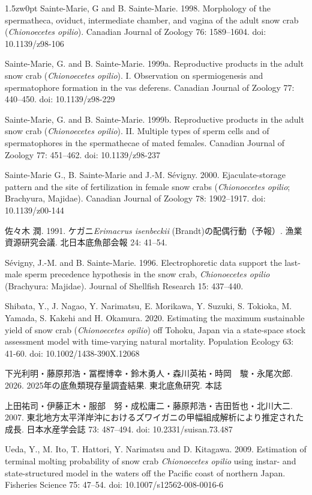\begin{indentation}{1.5zw}{0pt}
Sainte-Marie, G  and B. Sainte-Marie. 1998. Morphology of the spermatheca, oviduct, intermediate chamber, and vagina of the adult snow crab (\textit{Chionoecetes opilio}). Canadian Journal of Zoology 76: 1589--1604. doi: 10.1139/z98-106

Sainte-Marie, G. and B. Sainte-Marie. 1999a. Reproductive products in the adult snow crab (\textit{Chionoecetes opilio}). I. Observation on spermiogenesis and spermatophore formation in the vas deferens. Canadian Journal of Zoology 77: 440--450. doi: 10.1139/z98-229

Sainte-Marie, G. and B. Sainte-Marie. 1999b. Reproductive products in the adult snow crab (\textit{Chionoecetes opilio}). II. Multiple types of sperm cells and of spermatophores in the spermathecae of mated females. Canadian Journal of Zoology 77: 451--462. doi: 10.1139/z98-237

Sainte-Marie G., B. Sainte-Marie and J.-M. S\'{e}vigny. 2000. Ejaculate-storage pattern and the site of fertilization in female snow crabs (\textit{Chionoecetes opilio}; Brachyura, Majidae). Canadian Journal of Zoology 78: 1902--1917. doi: 10.1139/z00-144

佐々木 潤. 1991. ケガニ\textit{Erimacrus isenbeckii} (Brandt)の配偶行動（予報）. 漁業資源研究会議. 北日本底魚部会報 24: 41--54.

S\'{e}vigny, J.-M. and B. Sainte-Marie. 1996. Electrophoretic data support the last-male sperm precedence hypothesis in the snow crab, \textit{Chionoecetes opilio} (Brachyura: Majidae). Journal of Shellfish Research 15: 437--440. 

Shibata, Y., J. Nagao, Y. Narimatsu, E. Morikawa, Y. Suzuki, S. Tokioka, M. Yamada, S. Kakehi and H. Okamura. 2020. Estimating the maximum sustainable yield of snow crab (\textit{Chionoecetes opilio}) off Tohoku, Japan via a state-space stock assessment model with time-varying natural mortality. Population Ecology 63: 41-60. doi: 10.1002/1438-390X.12068

下光利明・藤原邦浩・冨樫博幸・鈴木勇人・森川英祐・時岡　駿・永尾次郎. 2026. 2025年の底魚類現存量調査結果. 東北底魚研究. 本誌

上田祐司・伊藤正木・服部　努・成松庸二・藤原邦浩・吉田哲也・北川大二. 2007. 東北地方太平洋岸沖におけるズワイガニの甲幅組成解析により推定された成長. 日本水産学会誌 73: 487--494. doi: 10.2331/suisan.73.487

Ueda, Y., M. Ito, T. Hattori, Y. Narimatsu and D. Kitagawa. 2009. Estimation of terminal molting probability of snow crab \textit{Chionoecetes opilio} using instar- and state-structured model in the waters off the Pacific coast of northern Japan. Fisheries Science 75: 47--54. doi: 10.1007/s12562-008-0016-6


\end{indentation}
